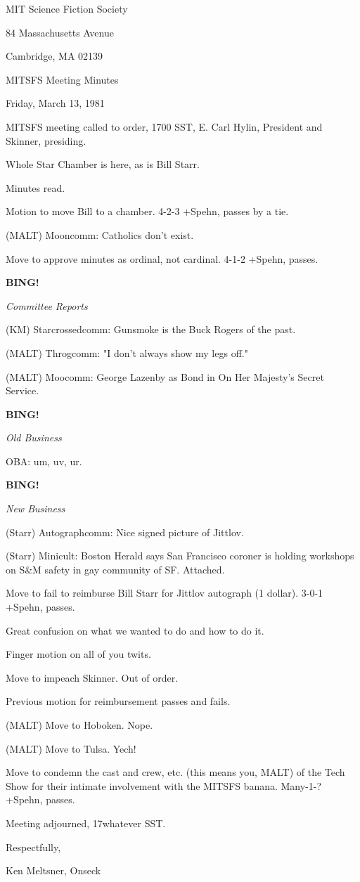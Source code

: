 \documentclass[12pt]{article}
\newcommand{\bing}{{\bf BING!} }
\newcommand{\goto}[1]{\bing \vskip 12pt \centerline{{\em{#1}}}}
\begin{document}
\begin{center}

MIT Science Fiction Society 

84 Massachusetts Avenue

Cambridge, MA 02139

\vspace{12pt}

MITSFS Meeting Minutes 

Friday, March 13, 1981

\end{center}
 
\vspace{18pt}

\setlength{\parskip}{6pt}

\noindent
MITSFS meeting called to order, 1700 SST,
E. Carl Hylin, President and Skinner, presiding.

Whole Star Chamber is here, as is Bill Starr.

Minutes read.

Motion to move Bill to a chamber. 4-2-3 +Spehn, passes by a tie.

(MALT) Mooncomm: Catholics don't exist.

Move to approve minutes as ordinal, not cardinal. 4-1-2 +Spehn, passes.

\goto{Committee Reports}

(KM) Starcrossedcomm: Gunsmoke is the Buck Rogers of the past.

(MALT) Throgcomm: "I don't always show my legs off."

(MALT) Moocomm: George Lazenby as Bond in On Her Majesty's Secret Service.

\goto{Old Business}

OBA: um, uv, ur.

\goto{New Business}

(Starr) Autographcomm: Nice signed picture of Jittlov.

(Starr) Minicult: Boston Herald says San Francisco coroner is holding workshops on S&M safety in gay community of SF. Attached.

Move to fail to reimburse Bill Starr for Jittlov autograph (1 dollar). 3-0-1 +Spehn, passes.

Great confusion on what we wanted to do and how to do it.

Finger motion on all of you twits.

Move to impeach Skinner. Out of order.

Previous motion for reimbursement passes and fails.

(MALT) Move to Hoboken. Nope.

(MALT) Move to Tulsa. Yech!

Move to condemn the cast and crew, etc. (this means you, MALT) of the Tech Show for their intimate involvement with the MITSFS banana. Many-1-? +Spehn, passes.

\vspace{12pt}

\noindent
Meeting adjourned, 17whatever SST.

\vspace{18pt}

\centerline{Respectfully,}
\centerline{Ken Meltsner, Onseck}
\end{document}
